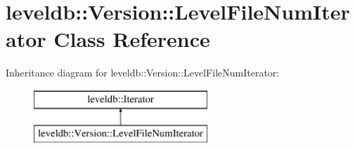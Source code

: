 \hypertarget{classleveldb_1_1_version_1_1_level_file_num_iterator}{}\section{leveldb\+:\+:Version\+:\+:Level\+File\+Num\+Iterator Class Reference}
\label{classleveldb_1_1_version_1_1_level_file_num_iterator}
Inheritance diagram for leveldb\+:\+:Version\+:\+:Level\+File\+Num\+Iterator\+:\begin{figure}[H]
\begin{center}
\leavevmode
\includegraphics[height=2.000000cm]{classleveldb_1_1_version_1_1_level_file_num_iterator}
\end{center}
\end{figure}
